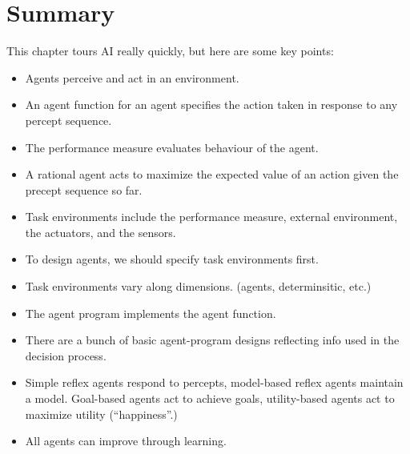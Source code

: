 

\section{Summary} %
\label{sec:summary}

This chapter tours AI really quickly, but here are some key points:
\begin{itemize}
    \item Agents perceive and act in an environment.
    \item An agent function for an agent specifies the action taken in response
    to any percept sequence.
    \item The performance measure evaluates behaviour of the agent.
    \item A rational agent acts to maximize the expected value of an action
    given the precept sequence so far.
    \item Task environments include the performance measure, external
    environment, the actuators, and the sensors.
    \item To design agents, we should specify task environments first.
    \item Task environments vary along dimensions. (agents, determinsitic, etc.)
    \item The agent program implements the agent function.
    \item There are a bunch of basic agent-program designs reflecting info used
    in the decision process.
    \item Simple reflex agents respond to percepts, model-based reflex agents
    maintain a model.
    Goal-based agents act to achieve goals, utility-based
    agents act to maximize utility (``happiness''.)
    \item All agents can improve through learning.
\end{itemize}


